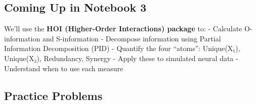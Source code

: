 \documentclass[
  11pt,
  letterpaper,
  oneside,
  openany]{book}
\begin{document}
\subsection{Coming Up in Notebook 3}\label{coming-up-in-notebook-3}

We'll use the \textbf{HOI (Higher-Order Interactions) package} to: -
Calculate O-information and S-information - Decompose information using
Partial Information Decomposition (PID) - Quantify the four ``atoms'':
Unique(X₁), Unique(X₂), Redundancy, Synergy - Apply these to simulated
neural data - Understand when to use each measure

\subsection{Practice Problems}\label{practice-problems}
\end{document}

